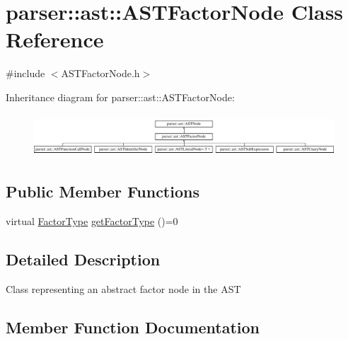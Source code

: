 \hypertarget{classparser_1_1ast_1_1ASTFactorNode}{}\section{parser\+:\+:ast\+:\+:A\+S\+T\+Factor\+Node Class Reference}
\label{classparser_1_1ast_1_1ASTFactorNode}


{\ttfamily \#include $<$A\+S\+T\+Factor\+Node.\+h$>$}

Inheritance diagram for parser\+:\+:ast\+:\+:A\+S\+T\+Factor\+Node\+:\begin{figure}[H]
\begin{center}
\leavevmode
\includegraphics[height=1.600000cm]{d4/dc3/classparser_1_1ast_1_1ASTFactorNode}
\end{center}
\end{figure}
\subsection*{Public Member Functions}
\begin{DoxyCompactItemize}
\item 
virtual \hyperlink{ASTFactorNode_8h_afbe2fcc03ef15b74a0c1ed1cda7ab0e8}{Factor\+Type} \hyperlink{classparser_1_1ast_1_1ASTFactorNode_a13eea7f949c0055dea0a9d7b715f16a8}{get\+Factor\+Type} ()=0
\end{DoxyCompactItemize}


\subsection{Detailed Description}
Class representing an abstract factor node in the A\+ST 

\subsection{Member Function Documentation}
\mbox{\label{classparser_1_1ast_1_1ASTFactorNode_a13eea7f949c0055dea0a9d7b715f16a8}} 
